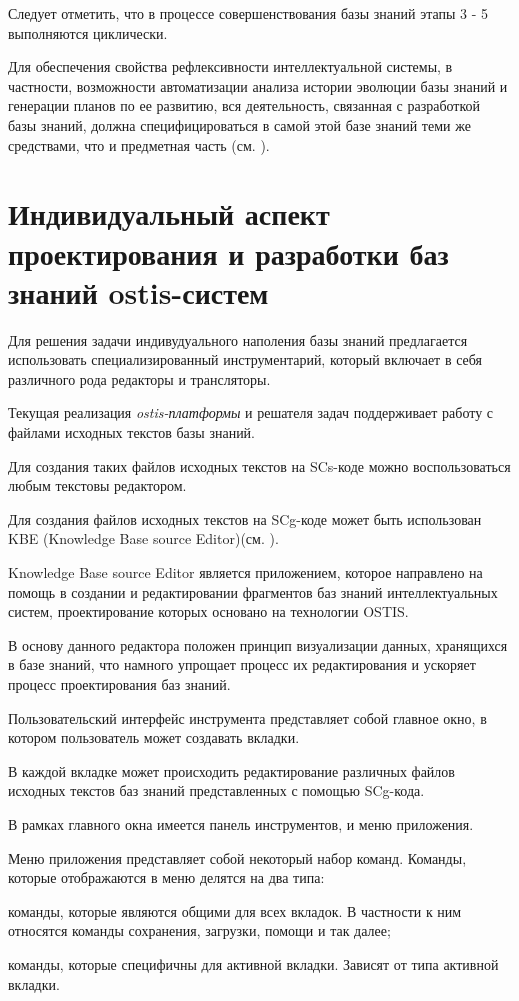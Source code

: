 Следует отметить, что в процессе совершенствования базы знаний этапы 3 - 5 выполняются циклически.

Для обеспечения свойства рефлексивности интеллектуальной системы, в частности, возможности автоматизации анализа истории эволюции базы знаний и генерации планов по ее развитию, вся деятельность, связанная с разработкой базы знаний, должна специфицироваться в самой этой базе знаний теми же средствами, что и предметная часть (см. ).

\section{Индивидуальный аспект проектирования и разработки баз знаний ostis-систем}
\label{sec_kb_design_individual}

Для решения задачи индивудуального наполения базы знаний предлагается использовать специализированный инструментарий, который включает в себя различного рода редакторы и трансляторы.

Текущая реализация \textit{ostis-платформы} и решателя задач поддерживает работу с файлами исходных текстов базы знаний.

Для создания таких файлов исходных текстов на SCs-коде можно воспользоваться любым текстовы редактором.


Для создания файлов исходных текстов на SCg-коде может быть использован KBE (Knowledge Base source Editor)(см. ). 

Knowledge Base source Editor является приложением, которое направлено на помощь в создании и редактировании фрагментов баз знаний интеллектуальных систем, проектирование которых основано на технологии OSTIS.

В основу данного редактора положен принцип визуализации данных, хранящихся в базе знаний, что намного упрощает процесс их редактирования и ускоряет процесс проектирования баз знаний.

Пользовательский интерфейс инструмента представляет собой главное окно, в котором пользователь может создавать вкладки.

В каждой вкладке может происходить редактирование различных файлов исходных текстов баз знаний представленных с помощью SCg-кода.

В рамках главного окна имеется панель инструментов, и меню приложения. 

Меню приложения представляет собой некоторый набор команд. Команды, которые отображаются в меню делятся на два типа:
\begin{textitemize}
\item команды, которые являются общими для всех вкладок. В частности к ним относятся команды сохранения, загрузки, помощи и так далее;
\item команды, которые специфичны для активной вкладки. Зависят от типа активной вкладки.
\end{textitemize}


